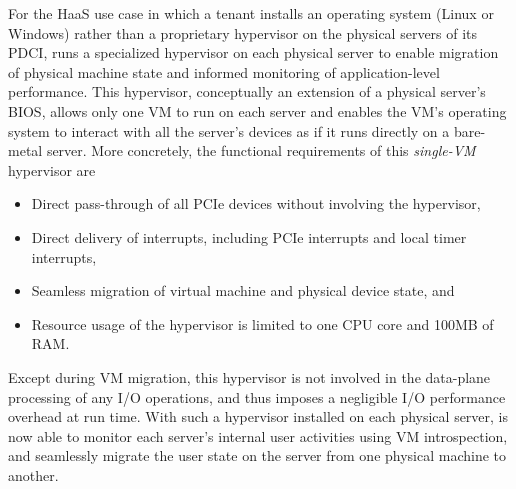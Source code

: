 For the HaaS use case in which a tenant installs an operating system (Linux or Windows) rather than a proprietary hypervisor on the physical servers of its PDCI, \na runs a specialized hypervisor on each physical server to enable migration of physical machine state and informed monitoring of application-level performance. This hypervisor, conceptually an extension of a physical server's BIOS, allows only one VM to run on each server and enables the VM's operating system to interact with all the server's devices as if it runs directly on a bare-metal server.
More concretely, the functional requirements of this {\em single-VM} hypervisor are
\begin{itemize} 
\setlength\itemsep{-0.04in}
\item Direct pass-through of all PCIe devices without involving the hypervisor,
\item Direct delivery of interrupts, including PCIe interrupts and local timer interrupts, 
\item Seamless migration of virtual machine and physical device state, and 
\item Resource usage of the hypervisor is limited to one CPU core and 100MB of RAM.
\end{itemize}
Except during VM migration, this hypervisor is not involved in the data-plane processing of any I/O operations, and thus imposes a negligible I/O performance overhead at run time.  
With such a hypervisor installed on each physical server, \na is now able to monitor each server's internal user activities using VM introspection, and seamlessly migrate the user state on the server from one physical machine to another. 

